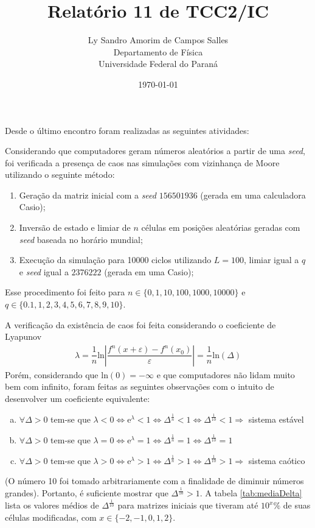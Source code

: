 \documentclass[12pt,a4paper,final]{article}
\title{Relatório 11 de TCC2/IC}
\author{Ly Sandro Amorim de Campos Salles\\Departamento de Física\\Universidade Federal do Paraná}
\date{\today}
\begin{document}
	\maketitle

  Desde o último encontro foram realizadas as seguintes atividades:

  Considerando que computadores geram números aleatórios a partir de uma \textit{seed}, foi verificada a presença de caos nas simulações com vizinhança de Moore utilizando o seguinte método:
  \begin{enumerate}
    \item Geração da matriz inicial com a \textit{seed} $156501936$ (gerada em uma calculadora Casio);
    \item Inversão de estado e limiar de $n$ células em posições aleatórias geradas com \textit{seed} baseada no horário mundial;
    \item Execução da simulação para 10000 ciclos utilizando $L=100$, limiar igual a $q$ e \textit{seed} igual a $2376222$ (gerada em uma Casio);
  \end{enumerate}
  Esse procedimento foi feito para $n\in\{0, 1, 10, 100, 1000, 10000\}$ e $q\in\{0.1, 1, 2, 3, 4, 5, 6, 7, 8, 9, 10\}$.

  A verificação da existência de caos foi feita considerando o coeficiente de Lyapunov
  \begin{align}
    \lambda = \dfrac{1}{n} \mathrm{ln}\left|\dfrac{f^n(x+\varepsilon) - f^n(x_0)}{\varepsilon}\right| = \dfrac{1}{n} \mathrm{ln}(\Delta)
  \end{align}
  Porém, considerando que $\mathrm{ln}(0)=-\infty$ e que computadores não lidam muito bem com infinito, foram feitas as seguintes observações com o intuito de desenvolver um coeficiente equivalente:
  \begin{enumerate}[a)]
    \item $\forall \Delta > 0$ tem-se que $\lambda < 0 \Leftrightarrow \mathrm{e}^\lambda < 1 \Leftrightarrow \Delta^\frac{1}{n} < 1 \Leftrightarrow \Delta^\frac{1}{10} < 1 \Rightarrow$ sistema estável 
    \item $\forall \Delta > 0$ tem-se que $\lambda = 0 \Leftrightarrow \mathrm{e}^\lambda = 1 \Leftrightarrow \Delta^\frac{1}{n} = 1 \Leftrightarrow \Delta^\frac{1}{10} = 1$ 
    \item $\forall \Delta > 0$ tem-se que $\lambda > 0 \Leftrightarrow \mathrm{e}^\lambda > 1 \Leftrightarrow \Delta^\frac{1}{n} > 1 \Leftrightarrow \Delta^\frac{1}{10} > 1 \Rightarrow$ sistema caótico 
  \end{enumerate}
 (O número 10 foi tomado arbitrariamente com a finalidade de diminuir números grandes). Portanto, é suficiente mostrar que $\Delta^\frac{1}{10} > 1$. A tabela \ref{tab:mediaDelta} lista os valores médios de $\Delta^\frac{1}{10}$ para matrizes iniciais que tiveram até $10^x\%$ de suas células modificadas, com $x\in\{-2, -1, 0, 1, 2\}$.
\end{document}
